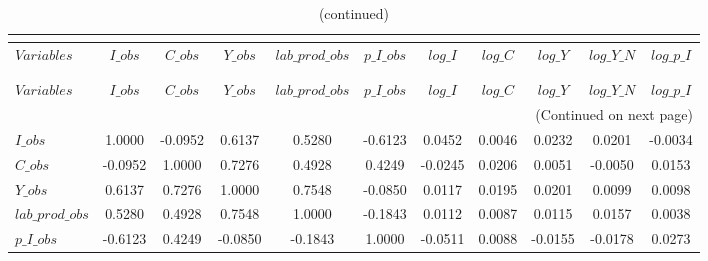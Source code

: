  
\begin{center}
\begin{longtable}{lcccccccccc} 
\caption{MATRIX OF CORRELATIONS}\\
 \label{Table:th_corr_matrix}\\
\toprule 
$Variables       $	 & 	 $           I\_obs$	 & 	 $           C\_obs$	 & 	 $           Y\_obs$	 & 	 $  lab\_prod\_obs$	 & 	 $       p\_I\_obs$	 & 	 $           log\_I$	 & 	 $           log\_C$	 & 	 $           log\_Y$	 & 	 $       log\_Y\_N$	 & 	 $       log\_p\_I$\\
\midrule \endfirsthead 
\caption{(continued)}\\
 \toprule \\ 
$Variables       $	 & 	 $           I\_obs$	 & 	 $           C\_obs$	 & 	 $           Y\_obs$	 & 	 $  lab\_prod\_obs$	 & 	 $       p\_I\_obs$	 & 	 $           log\_I$	 & 	 $           log\_C$	 & 	 $           log\_Y$	 & 	 $       log\_Y\_N$	 & 	 $       log\_p\_I$\\
\midrule \endhead 
\midrule \multicolumn{11}{r}{(Continued on next page)} \\ \bottomrule \endfoot 
\bottomrule \endlastfoot 
$I\_obs          $	 & 	            1.0000	 & 	           -0.0952	 & 	            0.6137	 & 	            0.5280	 & 	           -0.6123	 & 	            0.0452	 & 	            0.0046	 & 	            0.0232	 & 	            0.0201	 & 	           -0.0034 \\ 
$C\_obs          $	 & 	           -0.0952	 & 	            1.0000	 & 	            0.7276	 & 	            0.4928	 & 	            0.4249	 & 	           -0.0245	 & 	            0.0206	 & 	            0.0051	 & 	           -0.0050	 & 	            0.0153 \\ 
$Y\_obs          $	 & 	            0.6137	 & 	            0.7276	 & 	            1.0000	 & 	            0.7548	 & 	           -0.0850	 & 	            0.0117	 & 	            0.0195	 & 	            0.0201	 & 	            0.0099	 & 	            0.0098 \\ 
$lab\_prod\_obs  $	 & 	            0.5280	 & 	            0.4928	 & 	            0.7548	 & 	            1.0000	 & 	           -0.1843	 & 	            0.0112	 & 	            0.0087	 & 	            0.0115	 & 	            0.0157	 & 	            0.0038 \\ 
$p\_I\_obs       $	 & 	           -0.6123	 & 	            0.4249	 & 	           -0.0850	 & 	           -0.1843	 & 	            1.0000	 & 	           -0.0511	 & 	            0.0088	 & 	           -0.0155	 & 	           -0.0178	 & 	            0.0273 \\ 

\end{longtable}
\end{center}
